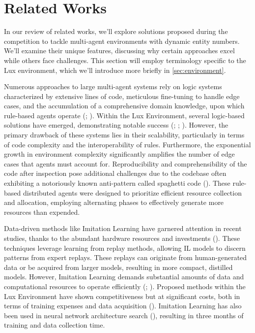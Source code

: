 \section{Related Works}

\noindent In our review of related works, we'll explore solutions proposed during the competition to tackle multi-agent environments with dynamic entity numbers. We'll examine their unique features, discussing why certain approaches excel while others face challenges. This section will employ terminology specific to the Lux environment, which we'll introduce more briefly in \autoref{sec:environment}.

\noindent Numerous approaches to large multi-agent systems rely on logic systems characterized by extensive lines of code, meticulous fine-tuning to handle edge cases, and the accumulation of a comprehensive domain knowledge, upon which rule-based agents operate (\textcolor{deepblue}{\cite{du2024survey}; \cite{Aguayo_Canela_2021}}). Within the Lux Environment, several logic-based solutions have emerged, demonstrating notable success (\textcolor{deepblue}{\cite{ry_andy}; \cite{tigga}; \cite{kostuch}}). However, the primary drawback of these systems lies in their scalability, particularly in terms of code complexity and the interoperability of rules. Furthermore, the exponential growth in environment complexity significantly amplifies the number of edge cases that agents must account for. Reproducibility and comprehensibility of the code after inspection pose additional challenges due to the codebase often exhibiting a notoriously known anti-pattern called spaghetti code (\textcolor{deepblue}{\cite{Politowski_2020}}). These rule-based distributed agents were designed to prioritize efficient resource collection and allocation, employing alternating phases to effectively generate more resources than expended.

\bigskip

\noindent Data-driven methods like Imitation Learning have garnered attention in recent studies, thanks to the abundant hardware resources and investments (\textcolor{deepblue}{\cite{imit_learning}}). These techniques leverage learning from replay methods, allowing IL models to discern patterns from expert replays. These replays can originate from human-generated data or be acquired from larger models, resulting in more compact, distilled models. However, Imitation Learning demands substantial amounts of data and computational resources to operate efficiently (\textcolor{deepblue}{\cite{goecks2022combining}; \cite{garg2022iqlearn}}). Proposed methods within the Lux Environment have shown competitiveness but at significant costs, both in terms of training expenses and data acquisition (\textcolor{deepblue}{\cite{nagradov}}). Imitation Learning has also been used in neural network architecture search (\textcolor{deepblue}{\cite{ferdinand}}), resulting in three months of training and data collection time.

